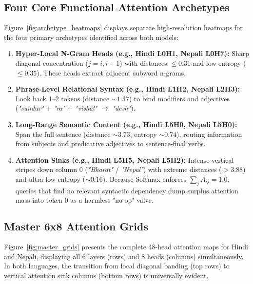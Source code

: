 \documentclass[10pt,a4paper]{article}
\begin{document}
\subsection{Four Core Functional Attention Archetypes}
Figure~\ref{fig:archetype_heatmaps} displays separate high-resolution heatmaps for the four primary archetypes identified across both models:
\begin{enumerate}[noitemsep,leftmargin=*]
    \item \textbf{Hyper-Local N-Gram Heads (e.g., Hindi L0H1, Nepali L0H7):} Sharp diagonal concentration ($j=i, i-1$) with distances $\le 0.31$ and low entropy ($\le 0.35$). These heads extract adjacent subword n-grams.
    \item \textbf{Phrase-Level Relational Syntax (e.g., Hindi L1H2, Nepali L2H3):} Look back 1--2 tokens (distance $\sim 1.37$) to bind modifiers and adjectives (\textit{"sundar"} + \textit{"ra"} + \textit{"vishal"} $\rightarrow$ \textit{"desh"}).
    \item \textbf{Long-Range Semantic Content (e.g., Hindi L5H0, Nepali L5H0):} Span the full sentence (distance $\sim 3.73$, entropy $\sim 0.74$), routing information from subjects and predicative adjectives to sentence-final verbs.
    \item \textbf{Attention Sinks (e.g., Hindi L5H5, Nepali L5H2):} Intense vertical stripes down column 0 (\textit{"Bharat"} / \textit{"Nepal"}) with extreme distances ($>3.88$) and ultra-low entropy ($\sim 0.16$). Because Softmax enforces $\sum_j A_{ij} = 1.0$, queries that find no relevant syntactic dependency dump surplus attention mass into token 0 as a harmless "no-op" valve.
\end{enumerate}

\subsection{Master 6x8 Attention Grids}
Figure~\ref{fig:master_grids} presents the complete 48-head attention maps for Hindi and Nepali, displaying all 6 layers (rows) and 8 heads (columns) simultaneously. In both languages, the transition from local diagonal banding (top rows) to vertical attention sink columns (bottom rows) is universally evident.
\end{document}

